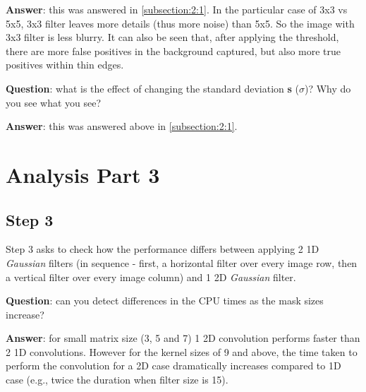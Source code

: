 \documentclass[lettersize,journal]{IEEEtran}
\begin{document}
\hfill

\noindent\textbf{Answer}: this was answered in \autoref{subsection:2:1}. In the particular case of 3x3 vs 5x5, 3x3 filter leaves more details (thus more noise) than 5x5. So the image with 3x3 filter is less blurry. It can also be seen that, after applying the threshold, there are more false positives in the background captured, but also more true positives within thin edges.

\hfill

\noindent\textbf{Question}: what is the effect of changing the standard deviation \textbf{s} ($\sigma$)? Why do you see what you see?

\hfill

\noindent\textbf{Answer}: this was answered above in \autoref{subsection:2:1}.

\section{Analysis Part 3}
\subsection{Step 3}

\noindent Step 3 asks to check how the performance differs between applying 2 1D \emph{Gaussian} filters (in sequence - first, a horizontal filter over every image row, then a vertical filter over every image column) and 1 2D \emph{Gaussian} filter.

\hfill

\noindent\textbf{Question}: can you detect differences in the CPU times as the mask sizes increase?

\hfill

\noindent\textbf{Answer}: for small matrix size (3, 5 and 7) 1 2D convolution performs faster than 2 1D convolutions. However for the kernel sizes of 9 and above, the time taken to perform the convolution for a 2D case dramatically increases compared to 1D case (e.g., twice the duration when filter size is 15).
\end{document}
